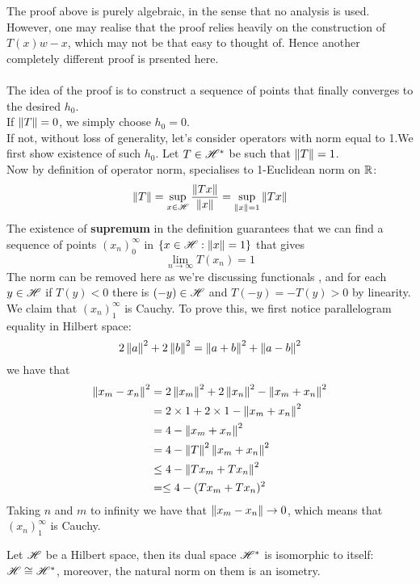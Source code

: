 \begin{remark}\rm\nextline
	The proof above is purely algebraic, in the sense that no analysis is used. However, one may realise that the proof relies heavily on the construction of $T(x)w-x$, which may not be that easy to thought of. Hence another completely different proof is prsented here. \\
	\pf\\
	The idea of the proof is to construct a sequence of points that finally converges to the desired $h_0$.\\
	If $\left\|{T}\right\|=0$, we simply choose $h_0=0$.\\
	If not, without loss of generality, let's consider operators with norm equal to 1.We first show existence of such $h_0$. Let $T\in\mathscr{H}^*$ be such that $\left\|{T}\right\|=1$.\\
	Now by definition of operator norm, specialises to 1-Euclidean norm on $\mathbb{R}$:
	$$
		\left\|{T}\right\|=\sup_{x\in\mathscr{H}}\frac{\left\|{Tx}\right\|}{\left\|{x}\right\|} =\sup_{\left\|{x}\right\|=1}\left\|{Tx}\right\|
	$$
	The existence of {\bf supremum} in the definition guarantees that we can find a sequence of points $(x_n)_0^\infty$ in $\{x\in\mathscr{H}:\left\|{x}\right\|=1\}$ that gives
	$$
		\lim_{n\to\infty}{T(x_n)}=1
	$$
	The norm can be removed here as we're discussing functionals , and for each $y\in\mathscr{H}$ if $T(y)<0$ there is $(-y)\in\mathscr{H}$ and $T(-y)=-T(y)>0$ by linearity.\\
	We claim that $(x_n)_1^\infty$ is Cauchy. To prove this, we first notice  parallelogram equality in Hilbert space:
	$$
		2\left\|{a}\right\|^2+2\left\|{b}\right\|^2=\left\|{a+b}\right\|^2+\left\|{a-b}\right\|^2
	$$
	we have that
	\begin{equation}
		\begin{split}
			\left\|{x_m-x_n}\right\|^2&=2\left\|{x_m}\right\|^2+2\left\|{x_n}\right\|^2-\left\|{x_m+x_n}\right\|^2\\
			&=2\times1+2\times1-\left\|{x_m+x_n}\right\|^2\\
			&=4-\left\|{x_m+x_n}\right\|^2\\
			&=4-\left\|{T}\right\|^2\left\|{x_m+x_n}\right\|^2\\
			&\leq4-\left\|{Tx_m+Tx_n}\right\|^2\\
			&=\leq4-(Tx_m+Tx_n)^2
		\end{split}
	\end{equation}
	Taking $n$ and $m$ to infinity we have that $\left\|{x_m-x_n}\right\|\to 0$, which means that $(x_n)_1^\infty$ is Cauchy.
\end{remark}
\begin{theorem}\label{dual space Hilbert}\rm\nextline
	Let $\mathscr{H}$ be a Hilbert space, then its dual space $\mathscr{H}^*$ is isomorphic to  itself: $\mathscr{H}\cong\mathscr{H}^*$, moreover, the natural norm on them is an isometry.\placeholder
\end{theorem}

